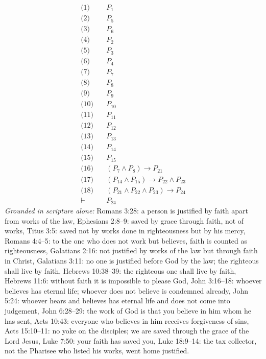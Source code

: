 \documentclass[11pt]{article}
\begin{document}
\begin{align*}
  \text{(1)} \quad & P_{1} \\
  \text{(2)} \quad & P_{5} \\
  \text{(3)} \quad & P_{6} \\
  \text{(4)} \quad & P_{2} \\
  \text{(5)} \quad & P_{3} \\
  \text{(6)} \quad & P_{4} \\
  \text{(7)} \quad & P_{7} \\
  \text{(8)} \quad & P_{8} \\
  \text{(9)} \quad & P_{9} \\
  \text{(10)} \quad & P_{10} \\
  \text{(11)} \quad & P_{11} \\
  \text{(12)} \quad & P_{12} \\
  \text{(13)} \quad & P_{13} \\
  \text{(14)} \quad & P_{14} \\
  \text{(15)} \quad & P_{15} \\
  \text{(16)} \quad & (P_{7} \land P_{8}) \rightarrow P_{21} \\
  \text{(17)} \quad & (P_{14} \land P_{15}) \rightarrow P_{22} \land P_{23} \\
  \text{(18)} \quad & (P_{21} \land P_{22} \land P_{23}) \rightarrow P_{24} \\
  \vdash \quad & P_{24}
\end{align*}
\emph{Grounded in scripture alone:} Romans 3:28: a person is justified by faith apart from works of the law, Ephesians 2:8–9: saved by grace through faith, not of works, Titus 3:5: saved not by works done in righteousness but by his mercy, Romans 4:4–5: to the one who does not work but believes, faith is counted as righteousness, Galatians 2:16: not justified by works of the law but through faith in Christ, Galatians 3:11: no one is justified before God by the law; the righteous shall live by faith, Hebrews 10:38–39: the righteous one shall live by faith, Hebrews 11:6: without faith it is impossible to please God, John 3:16–18: whoever believes has eternal life; whoever does not believe is condemned already, John 5:24: whoever hears and believes has eternal life and does not come into judgement, John 6:28–29: the work of God is that you believe in him whom he has sent, Acts 10:43: everyone who believes in him receives forgiveness of sins, Acts 15:10–11: no yoke on the disciples; we are saved through the grace of the Lord Jesus, Luke 7:50: your faith has saved you, Luke 18:9–14: the tax collector, not the Pharisee who listed his works, went home justified.
\end{document}
